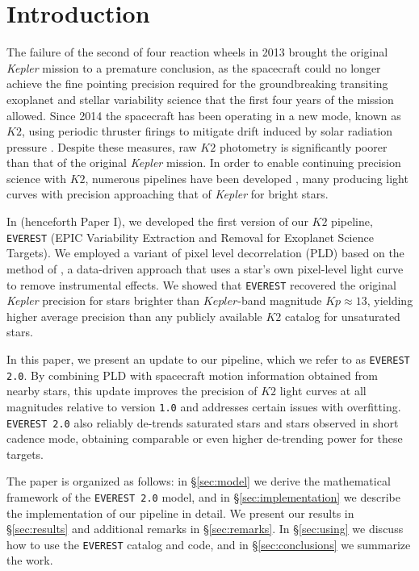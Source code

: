 \documentclass[]{aastex62}
\newcommand{\Kp}{\ensuremath{Kp}}
\newcommand{\edited}[1]{{\color{red} #1}}
\begin{document}

\section{Introduction}
\label{sec:intro}
The failure of the second of four reaction wheels in 2013 brought the original
\emph{Kepler} mission to a premature conclusion, as the spacecraft could no longer
achieve the fine pointing precision required for the groundbreaking
transiting exoplanet and stellar variability science that the first four years of the
mission allowed. Since 2014 the spacecraft has been operating in a new mode, known
as $K2$, \edited{using periodic thruster firings to mitigate drift induced by solar radiation pressure}
\citep{Howell14}. Despite these measures, raw $K2$ photometry is significantly
poorer than that of the original \emph{Kepler} mission. In order to enable
continuing precision science with $K2$, numerous pipelines have been developed
\citep[e.g.,][]{VanderburgJohnson14,Armstrong15,Lund15,Crossfield15,
ForemanMackey15,Huang15,Aigrain16,Libralato2016a,Libralato2016b},
many producing light curves with precision approaching that of \emph{Kepler} for
bright stars.

In \cite{Luger16} (henceforth Paper I), we developed the first version of our
$K2$ pipeline, \texttt{EVEREST} (EPIC Variability Extraction and Removal for Exoplanet
Science Targets).
We employed a variant of pixel level decorrelation (PLD) based on the method of \cite{Deming15},
a data-driven approach that uses a star's own pixel-level light curve to remove
instrumental effects. We showed that \texttt{EVEREST} recovered the original \emph{Kepler}
precision for stars brighter than $Kepler$-band magnitude $\Kp \approx 13$, yielding higher
average precision than any publicly available $K2$ catalog for unsaturated stars.

In this paper, we present an update to our pipeline, which we refer to as \texttt{EVEREST 2.0}.
By combining PLD with spacecraft motion information obtained from nearby stars,
this update improves the precision of $K2$ light curves at all magnitudes relative to version \texttt{1.0} and addresses
certain issues with overfitting. \texttt{EVEREST 2.0} also reliably de-trends saturated
stars and stars observed in short cadence mode, obtaining comparable or even higher de-trending
power for these targets.

The paper is organized as follows: in \S\ref{sec:model} we derive the mathematical
framework of the \texttt{EVEREST 2.0} model, and in \S\ref{sec:implementation} we describe
the implementation of our pipeline in detail. We present our results in \S\ref{sec:results}
and additional remarks in \S\ref{sec:remarks}. In \S\ref{sec:using} we discuss how
to use the \texttt{EVEREST} catalog and code, and in \S\ref{sec:conclusions} we
summarize the work.
\end{document}
